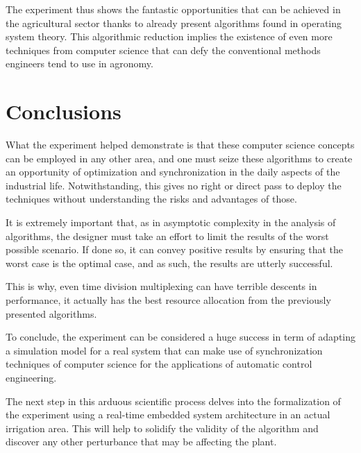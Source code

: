 \documentclass[12pt]{article}
\begin{document}
The experiment thus shows the fantastic opportunities that can be achieved in the agricultural sector thanks to already present algorithms found in operating system theory. This algorithmic reduction implies the existence of even more techniques from computer science that can defy the conventional methods engineers tend to use in agronomy. 

\section{Conclusions}

What the experiment helped demonstrate is that these computer science concepts can be employed in any other area, and one must seize these algorithms to create an opportunity of optimization and synchronization in the daily aspects of the industrial life. Notwithstanding, this gives no right or direct pass to deploy the techniques without understanding the risks and advantages of those.

It is extremely important that, as in asymptotic complexity in the analysis of algorithms, the designer must take an effort to limit the results of the worst possible scenario. If done so, it can convey positive results by ensuring that the worst case is the optimal case, and as such, the results are utterly successful.

This is why, even time division multiplexing can have terrible descents in performance, it actually has the best resource allocation from the previously presented algorithms.

To conclude, the experiment can be considered a huge success in term of adapting a simulation model for a real system that can make use of synchronization techniques of computer science for the applications of automatic control engineering.

The next step in this arduous scientific process delves into the formalization of the experiment using a real-time embedded system architecture in an actual irrigation area. This will help to solidify the validity of the algorithm and discover any other perturbance that may be affecting the plant.



\end{document}
